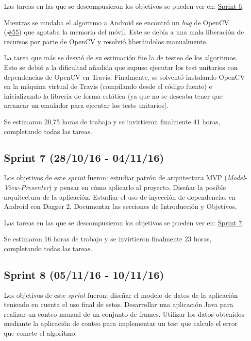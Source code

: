 Las tareas en las que se descompusieron los objetivos se pueden ver en:
\href{https://github.com/davidmigloz/go-bees/milestone/7?closed=1}{Sprint
6}.

Mientras se mudaba el algoritmo a Android se encontró un \emph{bug} de
OpenCV (\href{https://github.com/davidmigloz/go-bees/issues/55}{\#55})
que agotaba la memoria del móvil. Este se debía a una mala liberación de
recursos por parte de OpenCV y resolvió liberándolos manualmente.

La tarea que más se desvió de su estimación fue la de testeo de los
algoritmos. Esto se debió a la dificultad añadida que supuso ejecutar
los test unitarios con dependencias de OpenCV en Travis. Finalmente, se
solventó instalando OpenCV en la máquina virtual de Travis (compilando
desde el código fuente) e inicializando la librería de forma estática
(ya que no se deseaba tener que arrancar un emulador para ejecutar los
tests unitarios).

Se estimaron 20,75 horas de trabajo y se invirtieron finalmente 41
horas, completando todas las tareas.


\subsection{Sprint 7 (28/10/16 -
04/11/16)}\label{sprint-7-281016---041116}

Los objetivos de este \emph{sprint} fueron: estudiar patrón de
arquitectura MVP (\emph{Model-View-Presenter}) y pensar en cómo
aplicarlo al proyecto. Diseñar la posible arquitectura de la aplicación.
Estudiar el uso de inyección de dependencias en Android con Dagger 2.
Documentar las secciones de Introducción y Objetivos.

Las tareas en las que se descompusieron los objetivos se pueden ver en:
\href{https://github.com/davidmigloz/go-bees/milestone/8?closed=1}{Sprint
7}.

Se estimaron 16 horas de trabajo y se invirtieron finalmente 23 horas,
completando todas las tareas.


\subsection{Sprint 8 (05/11/16 -
10/11/16)}\label{sprint-8-051116---101116}

Los objetivos de este \emph{sprint} fueron: diseñar el modelo de datos
de la aplicación teniendo en cuenta el uso final de estos. Desarrollar
una aplicación Java para realizar un conteo manual de un conjunto de
frames. Utilizar los datos obtenidos mediante la aplicación de conteo
para implementar un test que calcule el error que comete el algoritmo.

